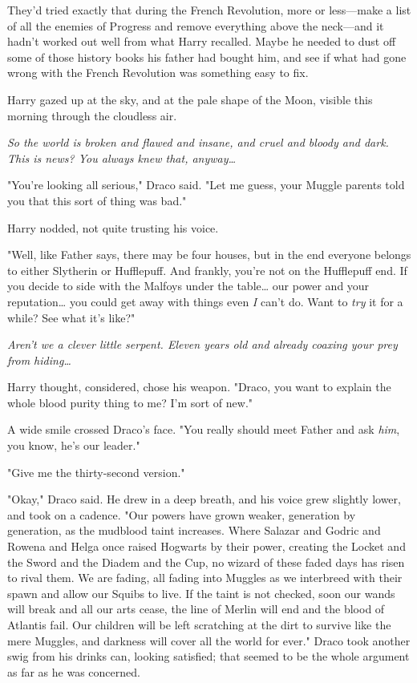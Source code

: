 They'd tried exactly that during the French Revolution, more or less---make a 
list of all the enemies of Progress and remove everything above the neck---and 
it hadn't worked out well from what Harry recalled. Maybe he needed to dust off 
some of those history books his father had bought him, and see if what had gone 
wrong with the French Revolution was something easy to fix.

Harry gazed up at the sky, and at the pale shape of the Moon, visible this 
morning through the cloudless air.

\emph{So the world is broken and flawed and insane, and cruel and bloody and 
dark. This is news? You always knew that, anyway{\ldots}}

"You're looking all serious," Draco said. "Let me guess, your Muggle parents 
told you that this sort of thing was bad."

Harry nodded, not quite trusting his voice.

"Well, like Father says, there may be four houses, but in the end everyone 
belongs to either Slytherin or Hufflepuff. And frankly, you're not on the 
Hufflepuff end. If you decide to side with the Malfoys under the table{\ldots} 
our power and your reputation{\ldots} you could get away with things even 
\emph{I} can't do. Want to \emph{try} it for a while? See what it's like?"

\emph{Aren't we a clever little serpent. Eleven years old and already coaxing 
your prey from hiding{\ldots}}

Harry thought, considered, chose his weapon. "Draco, you want to explain the 
whole blood purity thing to me? I'm sort of new."

A wide smile crossed Draco's face. "You really should meet Father and ask 
\emph{him}, you know, he's our leader."

"Give me the thirty-second version."

"Okay," Draco said. He drew in a deep breath, and his voice grew slightly 
lower, and took on a cadence. "Our powers have grown weaker, generation by 
generation, as the mudblood taint increases. Where Salazar and Godric and 
Rowena and Helga once raised Hogwarts by their power, creating the Locket and 
the Sword and the Diadem and the Cup, no wizard of these faded days has risen 
to rival them. We are fading, all fading into Muggles as we interbreed with 
their spawn and allow our Squibs to live. If the taint is not checked, soon our 
wands will break and all our arts cease, the line of Merlin will end and the 
blood of Atlantis fail. Our children will be left scratching at the dirt to 
survive like the mere Muggles, and darkness will cover all the world for ever." 
Draco took another swig from his drinks can, looking satisfied; that seemed to 
be the whole argument as far as he was concerned.

